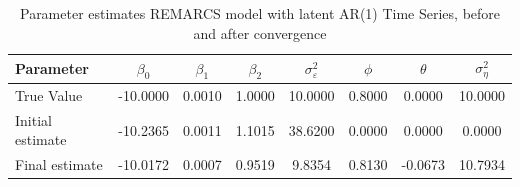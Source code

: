 \begin{table}[H]
\centering\begin{tabular}{lccccccc}
\toprule
Parameter & $\beta_0$ & $\beta_1$ & $\beta_2$ & $\sigma_\varepsilon^2$ & $\phi$ & $\theta$ & $\sigma_\eta^2$ \\
\midrule
True Value & -10.0000 & 0.0010 & 1.0000 & 10.0000 & 0.8000 & 0.0000 & 10.0000 \\
\midrule
Initial estimate & -10.2365 & 0.0011 & 1.1015 & 38.6200 & 0.0000 & 0.0000 & 0.0000 \\
Final estimate & -10.0172 & 0.0007 & 0.9519 & 9.8354 & 0.8130 & -0.0673 & 10.7934 \\
\hline
\end{tabular}
\caption{Parameter estimates REMARCS model with latent AR(1) Time Series, before and after convergence  }
\label{tab:param_estimates_ma}
\end{table}

